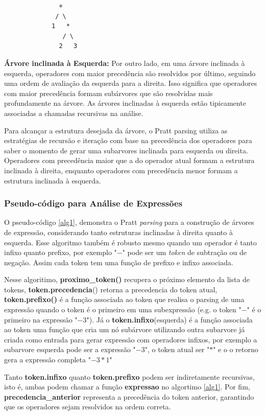 \documentclass[english, 
               brazil, 
               bsc] %
               {dcomp-abntex2}
\begin{document}
\begin{verbatim}
               +
              / \
             1   *
                / \
               2   3
\end{verbatim}

\textbf{Árvore inclinada à Esquerda:} Por outro lado, em uma árvore inclinada à esquerda, operadores com maior precedência são resolvidos por último, seguindo uma ordem de avaliação da esquerda para a direita. Isso significa que operadores com maior precedência formam subárvores que são resolvidas mais profundamente na árvore. As árvores inclinadas à esquerda estão tipicamente associadas a chamadas recursivas na análise.

Para alcançar a estrutura desejada da árvore, o Pratt parsing utiliza as estratégias de recursão e iteração com base na precedência dos operadores para saber o momento de gerar uma subarvores inclinada para esquerda ou direita. Operadores com precedência maior que a do operador atual formam a estrutura inclinada à direita, enquanto operadores com precedência menor formam a estrutura inclinada à esquerda.

\subsubsection{Pseudo-código para Análise de Expressões}

O pseudo-código \ref{alg1},
demonstra o Pratt \textit{parsing} para a construção de árvores de expressão, considerando tanto estruturas inclinadas à direita quanto à esquerda. Esse algoritmo também é robusto mesmo quando um operador é tanto infixo quanto prefixo, por exemplo "$-$" pode ser um \textit{token} de subtração ou de negação. Assim cada token tem uma função de prefixo e infixo associada.

Nesse algoritimo, 
\textbf{proximo\_token()} recupera o próximo elemento da lista de tokens,
\textbf{token.precedencia}() retorna a precedencia do token atual, \textbf{token.prefixo()} é a função associada ao token que realisa o parsing de uma expressão quando o token é o primeiro em uma subexpressão (e.g. o token "$-$" é o primeiro na expressão "$-3$"). Já o   
\textbf{token.infixo}(esquerda) é a função associada ao token uma função que cria um nó subárvore utilizando outra subarvore já criada como entrada para gerar expressão com operadores infixos, por exemplo a subarvore esquerda pode ser a expressão "$-3$", o token atual ser "$*$" e o o retorno gera a expressão completa "$-3 * 1$"

Tanto \textbf{token.infixo} quanto \textbf{token.prefixo} podem ser indiretamente recursivas, isto é, ambas podem chamar a função \textbf{expressao} no algortimo \ref{alg1}. 
Por fim, \textbf{precedencia\_anterior} representa a precedência do token anterior, garantindo que os operadores sejam resolvidos na ordem correta.
\end{document}
